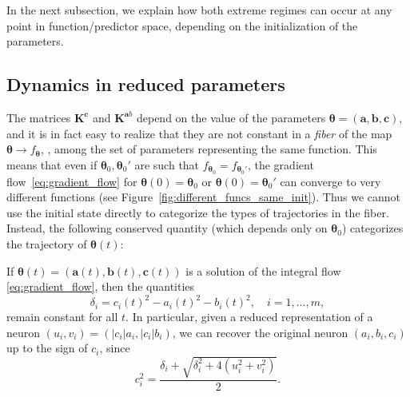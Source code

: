 In the next subsection, we explain how both extreme regimes can occur at any point in function/predictor space, depending on the initialization of the parameters.

\subsection{Dynamics in reduced parameters}

The matrices $\bm K^{\bm c}$ and $\bm K^{\bm ab}$ depend on the value of the parameters $\bm \theta = (\bm a, \bm b, \bm c)$, and it is in fact easy to realize that they are not constant in a \emph{fiber} of the map $\bm \theta \rightarrow f_{\bm \theta}$, \ie, among the set of parameters representing the same function. This means that even if $\bm \theta_0, \bm \theta_0'$ are such that $f_{\bm \theta_0} = f_{\bm \theta_0'}$, the gradient flow~\eqref{eq:gradient_flow} for $\bm \theta(0) = \bm \theta_0$ or $\bm \theta(0) = \bm \theta_0'$ can converge to very different functions (see Figure~\ref{fig:different_funcs_same_init}). Thus we cannot use the initial state directly to categorize the types of trajectories in the fiber. Instead, the following conserved quantity (which depends only on $\bm \theta_0$) categorizes the trajectory of $\bm \theta(t)$:

\begin{lemma} \label{le:fixed_delta}
If $\bm \theta(t) = (\bm a(t), \bm b(t), \bm c(t))$ is a solution of the integral flow \eqref{eq:gradient_flow}, then the quantities
\begin{equation}\label{eq:invariants}
\delta_i = c_i(t)^2 - a_i(t)^2 - b_i(t)^2, \quad i = 1, \ldots, m,
\end{equation}
remain constant for all $t$. In particular, given a reduced representation of a neuron $(u_i,v_i) = (|c_i|a_i,|c_i|b_i)$, we can recover the original neuron $(a_i,b_i,c_i)$ up to the sign of $c_i$, since
\begin{equation}\label{eq:c_uv}
    c_i^2 = \frac{\delta_i + \sqrt{\delta_i^2 + 4 (u_i^2 + v_i^2)}}{2}. 
\end{equation}
\end{lemma}

